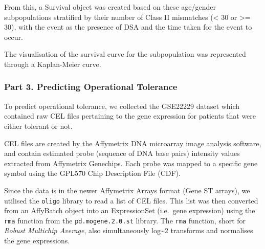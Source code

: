 \documentclass[a4paper,9pt,twocolumn,twoside,]{pinp}
\begin{document}
From this, a Survival object was created based on these age/gender
subpopulations stratified by their number of Class II mismatches
(\textless{} 30 or \textgreater{}= 30), with the event as the presence
of DSA and the time taken for the event to occur.

\begin{Shaded}
\end{Shaded}

The visualisation of the survival curve for the subpopulation was
represented through a Kaplan-Meier curve.

\hypertarget{part-3.-predicting-operational-tolerance}{%
\subsubsection{Part 3. Predicting Operational
Tolerance}\label{part-3.-predicting-operational-tolerance}}

To predict operational tolerance, we collected the GSE22229 dataset
which contained raw CEL files pertaining to the gene expression for
patients that were either tolerant or not.

CEL files are created by the Affymetrix DNA microarray image analysis
software, and contain estimated probe (sequence of DNA base pairs)
intensity values extracted from Affymetrix Genechips. Each probe was
mapped to a specific gene symbol using the GPL570 Chip Description File
(CDF).

Since the data is in the newer Affymetrix Arrays format (Gene ST
arrays), we utilised the \texttt{oligo} library to read a list of CEL
files. This list was then converted from an AffyBatch object into an
ExpressionSet (i.e.~gene expression) using the \texttt{rma} function
from the \texttt{pd.mogene.2.0.st} library. The \texttt{rma} function,
short for \emph{Robust Multichip Average}, also simultaneously
log\textasciitilde{}2 transforms and normalises the gene expressions.
\end{document}
